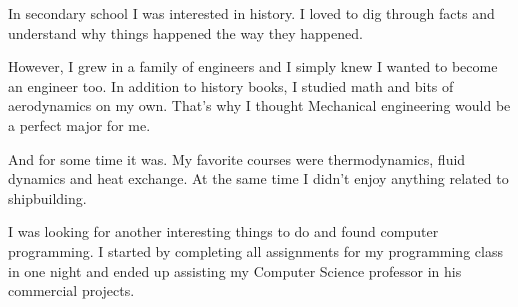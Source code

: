 \documentclass[12pt]{letter}
\begin{document}
\begin{llist}
  \startexperience

            \item In secondary school I was interested in history. I loved to dig through facts and understand why things happened the way they happened.

            \item However, I grew in a family of engineers and I simply knew I wanted to become an engineer too. In addition to history books, I studied math and bits of aerodynamics on my own. That's why I thought Mechanical engineering would be a perfect major for me.

            \item And for some time it was. My favorite courses were thermodynamics, fluid dynamics and heat exchange. At the same time I didn't enjoy anything related to shipbuilding.

            \item I was looking for another interesting things to do and found computer programming. I started by completing all assignments for my programming class in one night and ended up assisting my Computer Science professor in his commercial projects.

  \endexperience

\end{llist}
\end{document}
